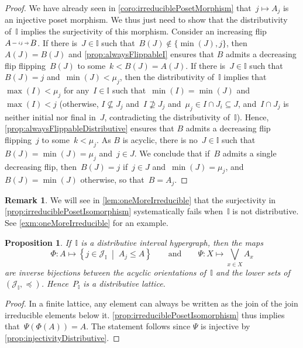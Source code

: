 \documentclass{amsart}
\newtheorem{proposition}[theorem]{Proposition}
\theoremstyle{definition}
\newtheorem{remark}[theorem]{Remark}
\newcommand{\cal}[1]{\mathcal{#1}} %
\newcommand{\set}[2]{\left\{ #1 \;\middle|\; #2 \right\}} %
\newcommand{\bigJoin}{\bigvee} %
\newcommand{\II}{\mathbb I} %
\newcommand{\cJ}{\cal{J}} %
\newcommand{\flip}[4]{\ensuremath{#1 \, \begin{tikzpicture}[scale=1,baseline=-.1cm] \path[->]  (0,0) edge node[fill=white,inner sep=2pt, font=\tiny ] {$#2#3$} (.7,0); \end{tikzpicture} \, #4}}
\begin{document}
\begin{proof}
We have already seen in \cref{coro:irreduciblePosetMorphism} that~$j \mapsto A_j$ is an injective poset morphism.
We thus just need to show that the distributivity of~$\II$ implies the surjectivity of this morphism.
Consider an increasing flip~\flip{A}{i}{j}{B}.
If there is~$J \in \II$ such that~$B(J) \notin \{\min(J), j\}$, then~$A(J) = B(J)$ and \cref{prop:alwaysFlippableI} ensures that $B$ admits a decreasing flip flipping~$B(J)$ to some~$k < B(J) = A(J)$.
If there is~$J \in \II$ such that~$B(J) = j$ and~$\min(J) < \mu_j$, then the distributivity of~$\II$ implies that~$\max(I) < \mu_j$ for any~$I \in \II$ such that~$\min(I) = \min(J)$ and~$\max(I) < j$ (otherwise, $I \not\subseteq J_j$ and~$I \not\supseteq J_j$ and~$\mu_j \in I \cap J_i \subseteq J$, and~$I \cap J_j$ is neither initial nor final in~$J$, contradicting the distributivity of~$\II$).
Hence, \cref{prop:alwaysFlippableDistributive} ensures that $B$ admits a decreasing flip flipping~$j$ to some~$k < \mu_j$.
As $B$ is acyclic, there is no~$J \in \II$ such that~$B(J) = \min(J) = \mu_j$ and~$j \in J$.
We conclude that if~$B$ admits a single decreasing flip, then~$B(J) = j$ if~$j \in J$ and~$\min(J) = \mu_j$, and~$B(J) = \min(J)$ otherwise, so that~$B = A_j$.
\end{proof}

\begin{remark}
We will see in \cref{lem:oneMoreIrreducible} that the surjectivity in \cref{prop:irreduciblePosetIsomorphism} systematically fails when~$\II$ is not distributive.
See \cref{exm:oneMoreIrreducible} for an example.
\end{remark}

\begin{proposition}
\label{prop:distributiveForwardI}
If~$\II$ is a distributive interval hypergraph, then the maps
\[
\Phi : A \mapsto \set{j \in \cJ_\II}{A_j \le A}
\qquad\text{and}\qquad
\Psi : X \mapsto \bigJoin_{x \in X} A_x
\]
are inverse bijections between the acyclic orientations of~$\II$ and the lower sets of~$(\cJ_\II, \preccurlyeq)$. Hence~$P_\II$ is a distributive lattice.
\end{proposition}

\begin{proof}
In a finite lattice, any element can always be written as the join of the join irreducible elements below it.
\cref{prop:irreduciblePosetIsomorphism} thus implies that~$\Psi(\Phi(A)) = A$.
The statement follows since $\Psi$ is injective by \cref{prop:injectivityDistributive}.
\end{proof}
\end{document}
